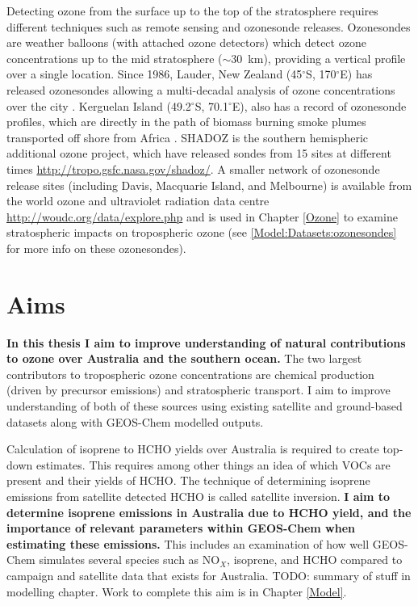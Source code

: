     Detecting ozone from the surface up to the top of the stratosphere requires different techniques such as remote sensing and ozonesonde releases.
    Ozonesondes are weather balloons (with attached ozone detectors) which detect ozone concentrations up to the mid stratosphere ($\sim 30$~km), providing a vertical profile over a single location.
    Since 1986, Lauder, New Zealand (45$^{\circ}$S, 170$^{\circ}$E) has released ozonesondes allowing a multi-decadal analysis of ozone concentrations over the city \parencite{Brinksma2002}.
    Kerguelan Island (49.2$^{\circ}$S, 70.1$^{\circ}$E), also has a record of ozonesonde profiles, which are directly in the path of biomass burning smoke plumes transported off shore from Africa \parencite{Baray2012}.
    SHADOZ is the southern hemispheric additional ozone project, which have released sondes from 15 sites at different times \url{http://tropo.gsfc.nasa.gov/shadoz/}.
    A smaller network of ozonesonde release sites (including Davis, Macquarie Island, and Melbourne) is available from the world ozone and ultraviolet radiation data centre \url{http://woudc.org/data/explore.php} and is used in Chapter \ref{Ozone} to examine stratospheric impacts on tropospheric ozone (see \ref{Model:Datasets:ozonesondes} for more info on these ozonesondes).
  
\section{Aims}
\label{LR:Aims}

  \textbf{In this thesis I aim to improve understanding of natural contributions to ozone over Australia and the southern ocean.}
  The two largest contributors to tropospheric ozone concentrations are chemical production (driven by precursor emissions) and stratospheric transport.
  I aim to improve understanding of both of these sources using existing satellite and ground-based datasets along with GEOS-Chem modelled outputs.
  
  Calculation of isoprene to HCHO yields over Australia is required to create top-down estimates.
  This requires among other things an idea of which VOCs are present and their yields of HCHO.
  The technique of determining isoprene emissions from satellite detected HCHO is called satellite inversion.
  \textbf{I aim to determine isoprene emissions in Australia due to HCHO yield, and the importance of relevant parameters within GEOS-Chem when estimating these emissions.}
  This includes an examination of how well GEOS-Chem simulates several species such as NO$_X$, isoprene, and HCHO compared to campaign and satellite data that exists for Australia.
  TODO: summary of stuff in modelling chapter.
  Work to complete this aim is in Chapter \ref{Model}.
  
